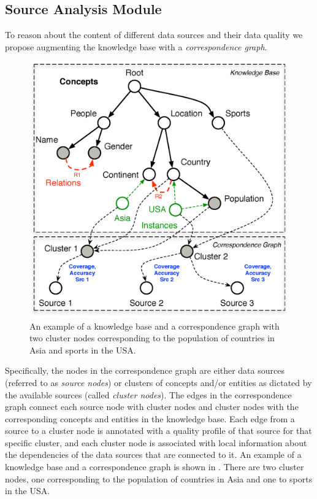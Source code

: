 \documentclass{sig-alternate}
\begin{document}
\subsection{Source Analysis Module}
To reason about the content of different data sources and their data quality we propose augmenting the knowledge base with a {\em correspondence graph}.
\begin{figure}
	\begin{center}
	\includegraphics[clip,scale=0.36]{fig/kgcg}
	\vspace{-5pt}
	\caption{An example of a knowledge base and a correspondence graph with two cluster nodes corresponding to the population of countries in Asia and sports in the USA.}
	\label{fig:kgcg}
	\end{center}
	\vspace{-20pt}
\end{figure}
Specifically, the nodes in the correspondence graph are either data sources (referred to as {\em source nodes}) or clusters of concepts and/or entities as dictated by the available sources (called {\em cluster nodes}). The edges in the correspondence graph connect each source node with cluster nodes and cluster nodes with the corresponding concepts and entities in the knowledge base.  Each edge from a source to a cluster node is annotated with a quality profile of that source for that specific cluster, and each cluster node is associated with local information about the dependencies of the data sources that are connected to it. An example of a knowledge base and a correspondence graph is shown in . There are two cluster nodes, one corresponding to the population of countries in Asia and one to sports in the USA. 
\end{document}
